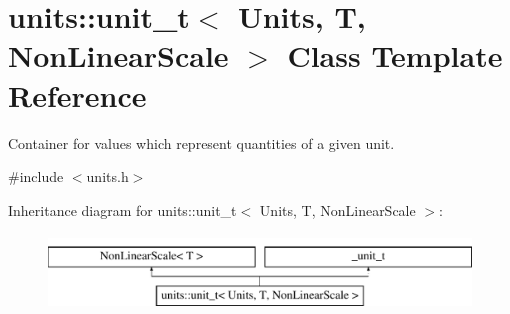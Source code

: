 \hypertarget{classunits_1_1unit__t}{}\section{units\+:\+:unit\+\_\+t$<$ Units, T, Non\+Linear\+Scale $>$ Class Template Reference}
\label{classunits_1_1unit__t}


Container for values which represent quantities of a given unit.  




{\ttfamily \#include $<$units.\+h$>$}

Inheritance diagram for units\+:\+:unit\+\_\+t$<$ Units, T, Non\+Linear\+Scale $>$\+:\begin{figure}[H]
\begin{center}
\leavevmode
\includegraphics[height=2.000000cm]{classunits_1_1unit__t}
\end{center}
\end{figure}
